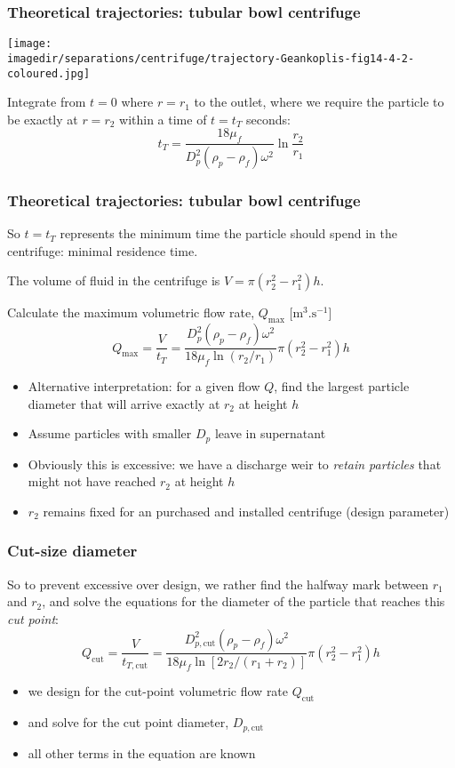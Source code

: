 \begin{frame}\frametitle{Theoretical trajectories: tubular bowl centrifuge}
	\begin{center}
		\texttt{[image: \\imagedir/separations/centrifuge/trajectory-Geankoplis-fig14-4-2-coloured.jpg]}
	\end{center}
	Integrate from $t=0$ where $r=r_1$ to the outlet, where we require the particle to be exactly at $r=r_2$ within a time of $t=t_T$ seconds:
	\[
		t_T = \frac{18 \mu_f}{D_p^2\left(\rho_p - \rho_f\right)\omega^2} \ln \frac{r_2}{r_1}
	\]
\end{frame}

\begin{frame}\frametitle{Theoretical trajectories: tubular bowl centrifuge}
	So $t=t_T$ represents the minimum time the particle should spend in the centrifuge: minimal residence time.
	
	\vspace{12pt}
	The volume of fluid in the centrifuge is $V = \pi \left(r_2^2 - r_1^2\right) h$. 
	
	\vspace{6pt}
	Calculate the maximum volumetric flow rate, $Q_\text{max}$ [$\text{m}^3.\text{s}^{-1}$]
	\[
		Q_\text{max} = \frac{V}{t_T} = \frac{D_p^2\left(\rho_p - \rho_f\right)\omega^2}{18 \mu_f \ln (r_2/r_1)} \pi \left(r_2^2 - r_1^2\right) h
	\]
	\begin{itemize}
		\item	Alternative interpretation: for a given flow $Q$, find the largest particle diameter that will arrive exactly at $r_2$ at height $h$
		\item	Assume particles with smaller $D_p$ leave in supernatant
		\item	Obviously this is excessive: we have a discharge weir to \emph{retain particles} that might not have reached $r_2$ at height $h$
		\item	$r_2$ remains fixed for an purchased and installed centrifuge (design parameter)
	\end{itemize}	
\end{frame}

\begin{frame}\frametitle{Cut-size diameter}
	So to prevent excessive over design, we rather find the halfway mark between $r_1$ and $r_2$, and solve the equations for the diameter of the particle that reaches this \emph{cut point}:
	\[
		Q_\text{cut} = \frac{V}{t_{T,\text{cut}}} = \frac{D_{p,\text{cut}}^2\left(\rho_p - \rho_f\right)\omega^2}{18 \mu_f \ln \left[2r_2/(r_1+r_2)\right]} \pi \left(r_2^2 - r_1^2\right) h
	\]
	\begin{itemize}
		\item	we design for the cut-point volumetric flow rate $Q_\text{cut}$
		\item	and solve for the cut point diameter, $D_{p,\text{cut}}$
		\item	all other terms in the equation are known
	\end{itemize}
\end{frame}

